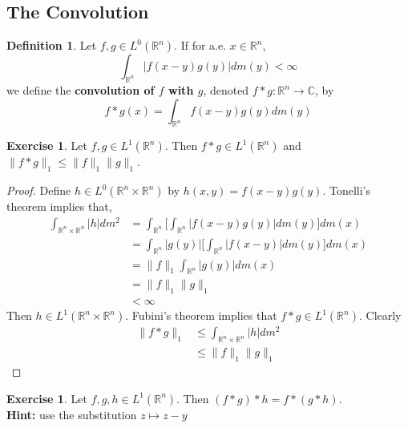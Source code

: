 \documentclass[12pt]{amsart}
\theoremstyle{definition}
\newtheorem{defn}[definition]{Definition}
\newtheorem{ex}[definition]{Exercise}
\newcommand{\C}{\mathbb{C}}
\newcommand{\R}{\mathbb{R}}
\newcommand{\lex}[1]{\label{ex:#1}}
\newcommand{\ld}[1]{\label{defn:#1}}
\begin{document}
	
	
	
	
	
	
	
	
	
	
	\newpage
	\subsection{The Convolution}
	\begin{defn}
	\ld{200}Let $f, g \in L^0(\R^n)$. If for a.e. $x \in \R^n$, $$\int_{\R^n} |f(x-y)g(y)| dm(y) < \infty$$  
	we define the \textbf{convolution of $f$ with $g$}, denoted $f * g: \R^n \rightarrow \C$, by $$ f * g(x) = \int_{\R^n} f(x-y)g(y) dm(y)$$
	\end{defn}
	
	\begin{ex}
	\lex{201}Let $f, g \in L^1(\R^n)$. Then $f * g \in L^1(\R^n)$ and $\|f * g\|_1 \leq \|f\|_1 \|g\|_1$. 
	\end{ex}	
	
	\begin{proof}
	Define $h \in L^0(\R^n \times \R^n)$ by $h(x,y) = f(x-y)g(y)$. Tonelli's theorem implies that, 
	\begin{align*}
	\int_{\R^n \times \R^n} |h| dm^2
	&= \int_{\R^n} \bigg[  \int_{\R^n} |f(x-y)g(y)| dm(y) \bigg] dm(x) \\
	&= \int_{\R^n} |g(y)| \bigg[  \int_{\R^n} |f(x-y)| dm(y) \bigg] dm(x) \\
	&=  \|f\|_1 \int_{\R^n} |g(y)| dm(x) \\
	&= \|f\|_1 \|g\|_1\\
	& < \infty
	\end{align*}
	Then $h \in L^1(\R^n \times \R^n)$. Fubini's theorem implies that $f * g \in L^1(\R^n)$. Clearly 
	\begin{align*}
	\|f *g\|_1 
	& \leq \int_{\R^n \times \R^n} |h| dm^2 \\
	& \leq \|f\|_1 \|g\|_1
	\end{align*}
	\end{proof}
	
	
	
	\begin{ex}
	\lex{202} Let $f, g, h \in L^1(\R^n)$. Then $(f * g) * h = f * (g * h)$. \\
	\textbf{Hint:} use the substitution $z \mapsto z-y$
	\end{ex}
	
\end{document}
